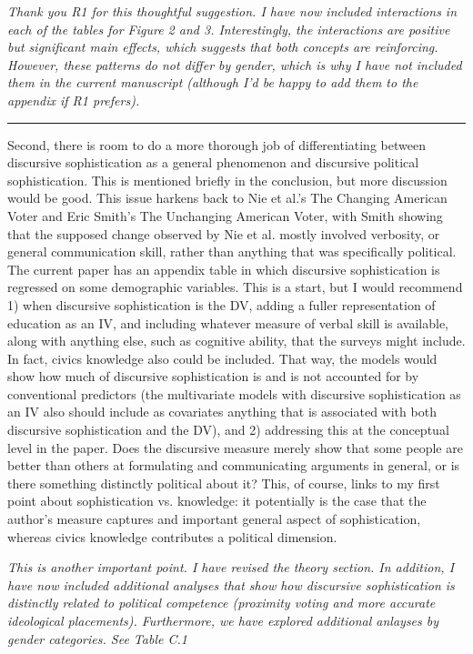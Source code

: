 \textit{Thank you R1 for this thoughtful suggestion. I have now included interactions in each of the tables for Figure 2 and 3. Interestingly, the interactions are positive but significant main effects, which suggests that both concepts are reinforcing. However, these patterns do not differ by gender, which is why I have not included them in the current manuscript (although I'd be happy to add them to the appendix if R1 prefers).}

\rule{\linewidth}{.01cm}

Second, there is room to do a more thorough job of differentiating between discursive sophistication as a general phenomenon and discursive political sophistication. This is mentioned briefly in the conclusion, but more discussion would be good. This issue harkens back to Nie et al.'s The Changing American Voter and Eric Smith's The Unchanging American Voter, with Smith showing that the supposed change observed by Nie et al. mostly involved verbosity, or general communication skill, rather than anything that was specifically political. The current paper has an appendix table in which discursive sophistication is regressed on some demographic variables. This is a start, but I would recommend 1) when discursive sophistication is the DV, adding a fuller representation of education as an IV, and including whatever measure of verbal skill is available, along with anything else, such as cognitive ability, that the surveys might include. In fact, civics knowledge also could be included. That way, the models would show how much of discursive sophistication is and is not accounted for by conventional predictors (the multivariate models with discursive sophistication as an IV also should include as covariates anything that is associated with both discursive sophistication and the DV), and 2) addressing this at the conceptual level in the paper. Does the discursive measure merely show that some people are better than others at formulating and communicating arguments in general, or is there something distinctly political about it? This, of course, links to my first point about sophistication vs. knowledge: it potentially is the case that the author's measure captures and important general aspect of sophistication, whereas civics knowledge contributes a political dimension.

\textit{This is another important point. I have revised the theory section. In addition, I have now included additional analyses that show how discursive sophistication is distinctly related to political competence (proximity voting and more accurate ideological placements). Furthermore, we have explored additional anlayses by gender categories. See Table C.1}

